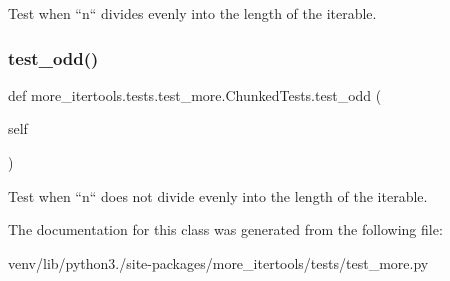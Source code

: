 \begin{DoxyVerb}Test when ``n`` divides evenly into the length of the iterable.\end{DoxyVerb}
 \mbox{\label{classmore__itertools_1_1tests_1_1test__more_1_1_chunked_tests_a1b03bc295efd9d71ee675d5e77f39866}} 
\subsubsection{\texorpdfstring{test\+\_\+odd()}{test\_odd()}}
{\footnotesize\ttfamily def more\+\_\+itertools.\+tests.\+test\+\_\+more.\+Chunked\+Tests.\+test\+\_\+odd (\begin{DoxyParamCaption}\item[{}]{self }\end{DoxyParamCaption})}

\begin{DoxyVerb}Test when ``n`` does not divide evenly into the length of the
iterable.\end{DoxyVerb}
 

The documentation for this class was generated from the following file\+:\begin{DoxyCompactItemize}
\item 
venv/lib/python3./site-\/packages/more\+\_\+itertools/tests/test\+\_\+more.\+py\end{DoxyCompactItemize}
